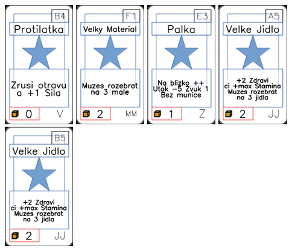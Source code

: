 \documentclass[a4paper]{article}
\begin{document}
	\includegraphics[width=3.0cm]{img-1_68}
	\includegraphics[width=3.0cm]{img-1_55}
	\includegraphics[width=3.0cm]{img-1_82}
	\includegraphics[width=3.0cm]{img-1_34}
	\includegraphics[width=3.0cm]{img-1_39}
\end{document}
